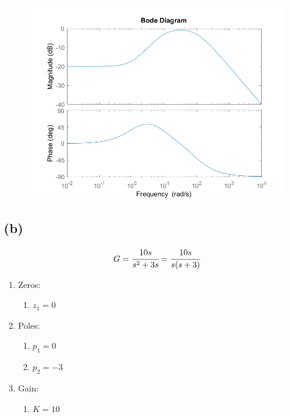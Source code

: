 \documentclass[letter]{article}
\numberwithin{equation}{section}
\begin{document}
\begin{figure}[h!]
	\centering
	\includegraphics[width=\textwidth]{figs/pblm2a.png}
\end{figure}

\newpage
\subsection{(b)}
\[
	G = \cfrac{
		10 s
	}{
		s^2 + 3s
	}
	= \cfrac{
		10 s
	}{
		s (s + 3)
	}
\]
\begin{enumerate}
	\item Zeros:
	\begin{enumerate}
		\item $z_1 = 0$
	\end{enumerate}
	\item Poles:
	\begin{enumerate}
		\item $p_1 = 0$
		\item $p_2 = -3$
	\end{enumerate}
	\item Gain:
	\begin{enumerate}
		\item $K = 10$
	\end{enumerate}
\end{enumerate}
\end{document}
